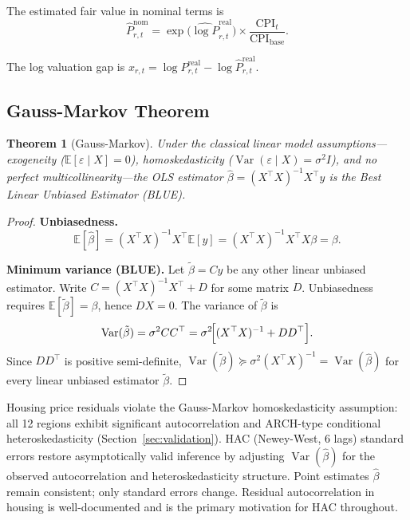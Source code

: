 \documentclass[11pt,a4paper]{article}
\theoremstyle{plain}
\newtheorem{theorem}{Theorem}[section]
\theoremstyle{definition}
\newcommand{\E}{\mathbb{E}}
\newcommand{\Var}{\operatorname{Var}}
\newcommand{\sig}{\sigma}
\begin{document}
The estimated fair value in nominal terms is
\begin{equation}
  \widehat{P}^{\mathrm{nom}}_{r,t}
  = \exp\!\bigl(\widehat{\log P}^{\mathrm{real}}_{r,t}\bigr)
    \times \frac{\mathrm{CPI}_t}{\mathrm{CPI}_{\mathrm{base}}}.
\end{equation}

The log valuation gap is $x_{r,t} = \log P^{\mathrm{real}}_{r,t}
- \log\widehat{P}^{\mathrm{real}}_{r,t}$.

\subsection{Gauss-Markov Theorem}

\begin{theorem}[Gauss-Markov]\label{thm:gm}
Under the classical linear model assumptions---exogeneity
($\E[\varepsilon \mid X] = 0$), homoskedasticity
($\Var(\varepsilon \mid X) = \sig^2 I$), and no perfect
multicollinearity---the OLS estimator
$\hat\beta = (X^\top X)^{-1}X^\top y$
is the Best Linear Unbiased Estimator (BLUE).
\end{theorem}

\begin{proof}
\textbf{Unbiasedness.}
\[
  \E[\hat\beta]
  = (X^\top X)^{-1}X^\top\E[y]
  = (X^\top X)^{-1}X^\top X\beta
  = \beta.
\]

\textbf{Minimum variance (BLUE).}
Let $\tilde\beta = Cy$ be any other linear unbiased estimator.
Write $C = (X^\top X)^{-1}X^\top + D$ for some matrix $D$.
Unbiasedness requires $\E[\tilde\beta] = \beta$, hence $DX = 0$.
The variance of $\tilde\beta$ is
\[
  \Var(\tilde\beta)
  = \sig^2 CC^\top
  = \sig^2\!\Bigl[(X^\top X)^{-1} + DD^\top\Bigr].
\]
Since $DD^\top$ is positive semi-definite,
$\Var(\tilde\beta) \succeq \sig^2(X^\top X)^{-1} = \Var(\hat\beta)$
for every linear unbiased estimator $\tilde\beta$.
\end{proof}

\begin{govbox}
Housing price residuals violate the Gauss-Markov homoskedasticity
assumption: all 12 regions exhibit significant autocorrelation and
ARCH-type conditional heteroskedasticity (Section~\ref{sec:validation}).
HAC (Newey-West, 6 lags) standard errors restore asymptotically valid
inference by adjusting $\Var(\hat\beta)$ for the observed autocorrelation
and heteroskedasticity structure.  Point estimates $\hat\beta$ remain
consistent; only standard errors change.  Residual autocorrelation in
housing is well-documented \cite{case1989} and is the primary motivation
for HAC throughout.
\end{govbox}
\end{document}

